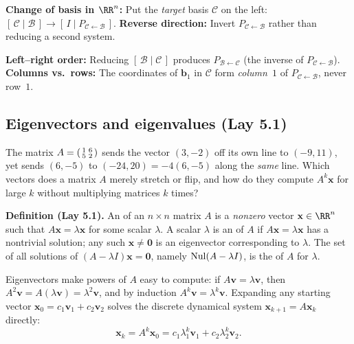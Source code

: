 \documentclass[10pt]{scrartcl}
\newcommand{\vv}[1]{\mathbf{#1}}
\begin{document}
\begin{shortcuts}
  \ii \textbf{Change of basis in $\RR^n$:} Put the \emph{target} basis $\mathcal C$ on the left: $[\,\mathcal C\mid\mathcal B\,]\to [\,I\mid P_{\mathcal C\leftarrow\mathcal B}\,]$.
  \ii \textbf{Reverse direction:} Invert $P_{\mathcal C\leftarrow\mathcal B}$ rather than reducing a second system.
\end{shortcuts}

\begin{trapbox}
  \ii \textbf{Left--right order:} Reducing $[\,\mathcal B\mid\mathcal C\,]$ produces $P_{\mathcal B\leftarrow\mathcal C}$ (the inverse of $P_{\mathcal C\leftarrow\mathcal B}$).
  \ii \textbf{Columns vs.\ rows:} The coordinates of $\vv b_1$ in $\mathcal C$ form \emph{column~$1$} of $P_{\mathcal C\leftarrow\mathcal B}$, never row~$1$.
\end{trapbox}

\subsection{Eigenvectors and eigenvalues (Lay 5.1)}

\begin{qbox}
  The matrix $A=\begin{psmallmatrix}1&6\\5&2\end{psmallmatrix}$ sends the vector $(3,-2)$ off its own line to $(-9,11)$, yet sends $(6,-5)$ to $(-24,20)=-4(6,-5)$ along the \emph{same} line. Which vectors does a matrix $A$ merely stretch or flip, and how do they compute $A^k\vv x$ for large $k$ without multiplying matrices $k$ times?
\end{qbox}

\noindent\textbf{Definition (Lay 5.1).} An  of an $n\times n$ matrix $A$ is a \emph{nonzero} vector $\vv x\in\RR^n$ such that $A\vv x=\lambda\vv x$ for some scalar $\lambda$. A scalar $\lambda$ is an  of $A$ if $A\vv x=\lambda\vv x$ has a nontrivial solution; any such $\vv x\neq\vv 0$ is an eigenvector corresponding to $\lambda$. The set of all solutions of $(A-\lambda I)\vv x=\vv 0$, namely $\operatorname{Nul}(A-\lambda I)$, is the  of $A$ for $\lambda$.

Eigenvectors make powers of $A$ easy to compute: if $A\vv v=\lambda\vv v$, then $A^2\vv v=A(\lambda\vv v)=\lambda^2\vv v$, and by induction $A^k\vv v=\lambda^k\vv v$. Expanding any starting vector $\vv x_0 = c_1\vv v_1+c_2\vv v_2$ solves the discrete dynamical system $\vv x_{k+1}=A\vv x_k$ directly:
\[
  \vv x_k = A^k\vv x_0 = c_1\lambda_1^k\vv v_1 + c_2\lambda_2^k\vv v_2.
\]
\end{document}
